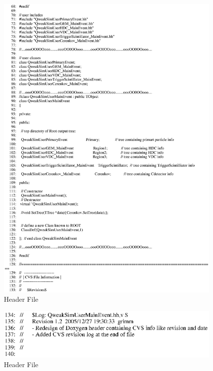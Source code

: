 \begin{figure}[h]
  \hspace{0cm}
  \includegraphics[scale=0.8]{./figures13/QweakSimUserMainEvent.hh-p2.eps}
  \caption{Header File}
           \label{fig:XIII-SC-7}
\end{figure}

\clearpage

\begin{figure}[h]
  \hspace{0cm}
  \includegraphics[scale=0.8]{./figures13/QweakSimUserMainEvent.hh-p3.eps}
  \caption{Header File}
           \label{fig:XIII-SC-8}
\end{figure}

